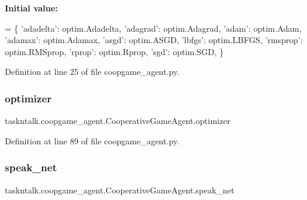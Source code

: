 {\bfseries Initial value\+:}
\begin{DoxyCode}
=  \{
        \textcolor{stringliteral}{'adadelta'}: optim.Adadelta,
        \textcolor{stringliteral}{'adagrad'}: optim.Adagrad,
        \textcolor{stringliteral}{'adam'}: optim.Adam,
        \textcolor{stringliteral}{'adamax'}: optim.Adamax,
        \textcolor{stringliteral}{'asgd'}: optim.ASGD,
        \textcolor{stringliteral}{'lbfgs'}: optim.LBFGS,
        \textcolor{stringliteral}{'rmsprop'}: optim.RMSprop,
        \textcolor{stringliteral}{'rprop'}: optim.Rprop,
        \textcolor{stringliteral}{'sgd'}: optim.SGD,
    \}
\end{DoxyCode}


Definition at line 25 of file coopgame\+\_\+agent.\+py.

\mbox{\label{classtaskntalk_1_1coopgame__agent_1_1CooperativeGameAgent_a3060a1071b62f3e07a2a1ea9c8ebbc8f}} 
\subsubsection{\texorpdfstring{optimizer}{optimizer}}
{\footnotesize\ttfamily taskntalk.\+coopgame\+\_\+agent.\+Cooperative\+Game\+Agent.\+optimizer}



Definition at line 89 of file coopgame\+\_\+agent.\+py.

\mbox{\label{classtaskntalk_1_1coopgame__agent_1_1CooperativeGameAgent_a64a71d986aa5d8b1a0befa812a5c3873}} 
\subsubsection{\texorpdfstring{speak\+\_\+net}{speak\_net}}
{\footnotesize\ttfamily taskntalk.\+coopgame\+\_\+agent.\+Cooperative\+Game\+Agent.\+speak\+\_\+net}



